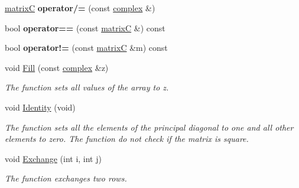 \begin{DoxyCompactItemize}
\mbox{\hyperlink{classmatrix_c}{matrixC}} {\bfseries operator/=} (const \mbox{\hyperlink{classcomplex}{complex}} \&)
\item 
\mbox{\label{classmatrix_c_afea62d5f6f4e300fccce98118d61532d}} 
bool {\bfseries operator==} (const \mbox{\hyperlink{classmatrix_c}{matrixC}} \&) const
\item 
\mbox{\label{classmatrix_c_abf75721e3eec535988ae0b2d49905751}} 
bool {\bfseries operator!=} (const \mbox{\hyperlink{classmatrix_c}{matrixC}} \&m) const
\item 
\mbox{\label{classmatrix_c_ac5261695dffb2b3baf6f03da1d32d5eb}} 
void \mbox{\hyperlink{classmatrix_c_ac5261695dffb2b3baf6f03da1d32d5eb}{Fill}} (const \mbox{\hyperlink{classcomplex}{complex}} \&z)
\begin{DoxyCompactList}\small\item\em The function sets all values of the array to z. \end{DoxyCompactList}\item 
\mbox{\label{classmatrix_c_a521f6a7fff5de8401e194d99f75ef179}} 
void \mbox{\hyperlink{classmatrix_c_a521f6a7fff5de8401e194d99f75ef179}{Identity}} (void)
\begin{DoxyCompactList}\small\item\em The function sets all the elements of the principal diagonal to one and all other elements to zero. The function do not check if the matrix is square. \end{DoxyCompactList}\item 
\mbox{\label{classmatrix_c_a7ed75aec8114e3ceaa890a8f2aed21e2}} 
void \mbox{\hyperlink{classmatrix_c_a7ed75aec8114e3ceaa890a8f2aed21e2}{Exchange}} (int i, int j)
\begin{DoxyCompactList}\small\item\em The function exchanges two rows. \end{DoxyCompactList}\end{DoxyCompactItemize}
